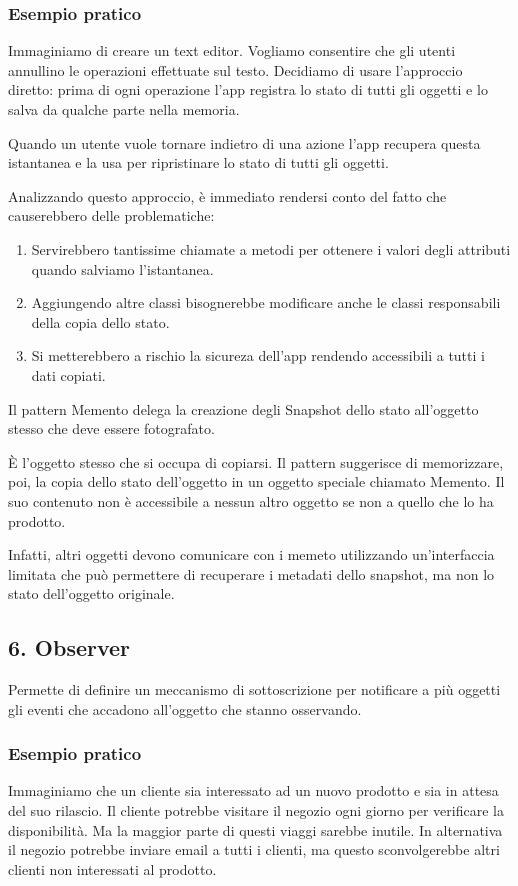 \documentclass{report}
\begin{document}
\subsubsection*{Esempio pratico}
Immaginiamo di creare un text editor. Vogliamo consentire che gli utenti annullino le operazioni effettuate sul testo. Decidiamo di usare l'approccio diretto: prima di ogni operazione l'app registra lo stato di tutti gli oggetti e lo salva da qualche parte nella memoria.

\noindent
Quando un utente vuole tornare indietro di una azione l'app recupera questa istantanea e la usa per ripristinare lo stato di tutti gli oggetti.

\noindent
Analizzando questo approccio, è immediato rendersi conto del fatto che causerebbero delle problematiche:
\begin{enumerate}
    \item Servirebbero tantissime chiamate a metodi per ottenere i valori degli attributi quando salviamo l'istantanea.
    \item Aggiungendo altre classi bisognerebbe modificare anche le classi responsabili della copia dello stato.
    \item Si metterebbero a rischio la sicureza dell'app rendendo accessibili a tutti i dati copiati.
\end{enumerate}

\newpage
\noindent
Il pattern Memento delega la creazione degli Snapshot dello stato all'oggetto stesso che deve essere fotografato.

\noindent
\`E l'oggetto stesso che si occupa di copiarsi. Il pattern suggerisce di memorizzare, poi, la copia dello stato dell'oggetto in un oggetto speciale chiamato Memento. Il suo contenuto non è accessibile a nessun altro oggetto se non a quello che lo ha prodotto.

\noindent
Infatti, altri oggetti devono comunicare con i memeto utilizzando un'interfaccia limitata che può permettere di recuperare i metadati dello snapshot, ma non lo stato dell'oggetto originale.

\subsection*{6. Observer}
Permette di definire un meccanismo di sottoscrizione per notificare a più oggetti gli eventi che accadono all'oggetto che stanno osservando.

\subsubsection*{Esempio pratico}
Immaginiamo che un cliente sia interessato ad un nuovo prodotto e sia in attesa del suo rilascio. Il cliente potrebbe visitare il negozio ogni giorno per verificare la disponibilità. Ma la maggior parte di questi viaggi sarebbe inutile. In alternativa il negozio potrebbe inviare email a tutti i clienti, ma questo sconvolgerebbe altri clienti non interessati al prodotto.
\end{document}
